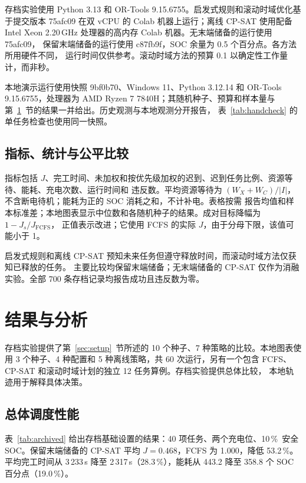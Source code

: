 \documentclass[11pt,a4paper,fontset=none]{ctexart}
\newcommand{\pct}{\,\%}
\begin{document}
存档实验使用 Python 3.13 和 OR-Tools 9.15.6755。启发式规则和滚动时域优化基于提交版本 75afc09 在双 vCPU 的 Colab
机器上运行；离线 CP-SAT 使用配备 Intel Xeon 2.20\,GHz 处理器的高内存 Colab 机器。无末端储备的运行使用 75afc09，
保留末端储备的运行使用 c87fb9f，SOC 余量为 0.5 个百分点。各方法所用硬件不同，
运行时间仅供参考。滚动时域方法的预算 0.1 以确定性工作量计，而非秒。

本地演示运行使用快照 9bf0b70、Windows 11、Python 3.12.14 和 OR-Tools 9.15.6755，处理器为 AMD Ryzen 7
7840H；其随机种子、预算和样本量与第~\ref{sec:results}~节的结果一并给出。历史观测与本地观测分开报告，
表~\ref{tab:handcheck} 的单任务检查也使用同一快照。

\subsection{指标、统计与公平比较}

指标包括 $J$、完工时间、未加权和按优先级加权的迟到、迟到任务比例、资源等待、能耗、充电次数、运行时间和
违反数。平均资源等待为 $(W_X + W_C)/|I|$，不含断电待机；能耗为正的 SOC 消耗之和，不计补电。表格按需
报告均值和样本标准差；本地图表显示中位数和各随机种子的结果。成对目标降幅为 $1 - J_s / J_{\text{FCFS}}$，
正值表示改进；它使用 FCFS 的实际 $J$，由于分母下限，该值可能小于 1。

启发式规则和离线 CP-SAT 预知未来任务但遵守释放时间，而滚动时域方法仅获知已释放的任务。
主要比较均保留末端储备；无末端储备的 CP-SAT 仅作为消融实验。全部 700 条存档记录均报告成功且违反数为零。

\section{结果与分析}
\label{sec:results}

存档实验提供了第~\ref{sec:setup}~节所述的 10 个种子、7 种策略的比较。本地图表使用 3 个种子、4 种配置和
5 种离线策略，共 60 次运行，另有一个包含 FCFS、CP-SAT 和滚动时域计划的独立 12 任务算例。存档实验提供总体比较，
本地轨迹用于解释具体决策。

\subsection{总体调度性能}

表~\ref{tab:archived} 给出存档基础设置的结果：40 项任务、两个充电位、10\pct\ 安全 SOC。保留末端储备的 CP-SAT
平均 $J = 0.468$，FCFS 为 1.000，降低 53.2\pct。平均完工时间从 3\,233\,s 降至 2\,317\,s（28.3\pct），能耗从
443.2 降至 358.8 个 SOC 百分点（19.0\pct）。
\end{document}
